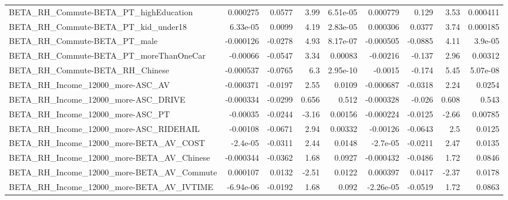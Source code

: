 \begin{tabular}{lrrrrrrrr}
BETA\_RH\_Commute-BETA\_PT\_highEducation              &    0.000275 &       0.0577 &     3.99 & 6.51e-05 &   0.000779 &       0.129 &         3.53 &      0.000411 \\
BETA\_RH\_Commute-BETA\_PT\_kid\_under18                &    6.33e-05 &       0.0099 &     4.19 & 2.83e-05 &   0.000306 &      0.0377 &         3.74 &      0.000185 \\
BETA\_RH\_Commute-BETA\_PT\_male                       &   -0.000126 &      -0.0278 &     4.93 & 8.17e-07 &  -0.000505 &     -0.0885 &         4.11 &       3.9e-05 \\
BETA\_RH\_Commute-BETA\_PT\_moreThanOneCar             &    -0.00066 &      -0.0547 &     3.34 &  0.00083 &   -0.00216 &      -0.137 &         2.96 &       0.00312 \\
BETA\_RH\_Commute-BETA\_RH\_Chinese                    &   -0.000537 &      -0.0765 &      6.3 & 2.95e-10 &    -0.0015 &      -0.174 &         5.45 &      5.07e-08 \\
BETA\_RH\_Income\_12000\_more-ASC\_AV                   &   -0.000371 &      -0.0197 &     2.55 &   0.0109 &  -0.000687 &     -0.0318 &         2.24 &        0.0254 \\
BETA\_RH\_Income\_12000\_more-ASC\_DRIVE                &   -0.000334 &      -0.0299 &    0.656 &    0.512 &  -0.000328 &      -0.026 &        0.608 &         0.543 \\
BETA\_RH\_Income\_12000\_more-ASC\_PT                   &    -0.00035 &      -0.0244 &    -3.16 &  0.00156 &  -0.000224 &     -0.0125 &        -2.66 &       0.00785 \\
BETA\_RH\_Income\_12000\_more-ASC\_RIDEHAIL             &    -0.00108 &      -0.0671 &     2.94 &  0.00332 &   -0.00126 &     -0.0643 &          2.5 &        0.0125 \\
BETA\_RH\_Income\_12000\_more-BETA\_AV\_COST             &    -2.4e-05 &      -0.0311 &     2.44 &   0.0148 &   -2.7e-05 &     -0.0211 &         2.47 &        0.0135 \\
BETA\_RH\_Income\_12000\_more-BETA\_AV\_Chinese          &   -0.000344 &      -0.0362 &     1.68 &   0.0927 &  -0.000432 &     -0.0486 &         1.72 &        0.0846 \\
BETA\_RH\_Income\_12000\_more-BETA\_AV\_Commute          &    0.000107 &       0.0132 &    -2.51 &   0.0122 &   0.000397 &      0.0417 &        -2.37 &        0.0178 \\
BETA\_RH\_Income\_12000\_more-BETA\_AV\_IVTIME           &   -6.94e-06 &      -0.0192 &     1.68 &    0.092 &  -2.26e-05 &     -0.0519 &         1.72 &        0.0863 \\

\end{tabular}
